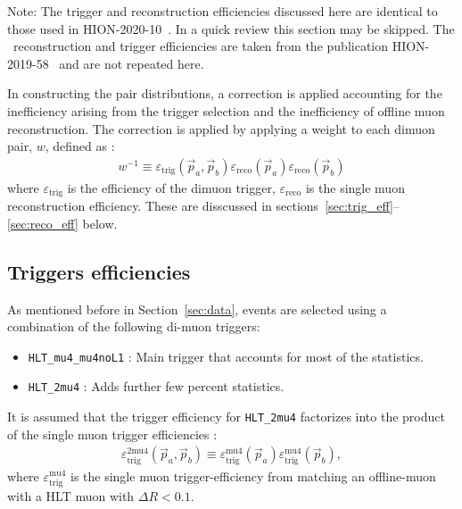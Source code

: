 {Note: The trigger and reconstruction efficiencies discussed here are
  identical to those used in HION-2020-10~\cite{HION-2020-10}.
In a quick review this section may be skipped.
The \pp\ reconstruction and trigger efficiencies are taken from
  the publication HION-2019-58~\cite{HION-2019-58} and are not repeated here.
}

In constructing the pair distributions, a correction is
  applied accounting for the inefficiency arising from the trigger
  selection and the inefficiency of offline muon reconstruction.
The correction is applied by applying a weight to each dimuon pair,
  $w$, defined as :
\begin{eqnarray}
w^{-1}\equiv \varepsilon_{\mathrm{trig}} (\vec{p}_{a},\vec{p}_{b})
\varepsilon_{\mathrm{reco}}(\vec{p}_{a})  \varepsilon_{\mathrm{reco}}(\vec{p}_{b})
\label{eq:net_eff_correction}
\end{eqnarray}
where $\varepsilon_{\mathrm{trig}}$ is the efficiency
  of the dimuon trigger,  $\varepsilon_{\mathrm{reco}}$ is the
  single muon reconstruction efficiency. 
These are disscussed in sections~\ref{sec:trig_eff}--\ref{sec:reco_eff} below.


\subsection{Triggers efficiencies\label{sec:trig_eff}}

As mentioned before in Section~\ref{sec:data}, events are selected using a combination
  of the following di-muon triggers:
\begin{itemize}
\item \verb=HLT_mu4_mu4noL1= : Main trigger that accounts for most of the statistics.
\item \verb=HLT_2mu4= : Adds further few percent statistics.
\end{itemize}


It is assumed that the trigger efficiency for \verb=HLT_2mu4= factorizes into the
  product of the single muon trigger efficiencies :
\begin{eqnarray}
\varepsilon_{\mathrm{trig}}^{\mathrm{2mu4}}
(\vec{p}_{a},\vec{p}_{b}) \equiv
\varepsilon_{\mathrm{trig}}^{\mathrm{mu4}}   (\vec{p}_{a})
\varepsilon_{\mathrm{trig}}^{\mathrm{mu4}}   (\vec{p}_{b}),
\label{eq:2mu3_eff}
\end{eqnarray}
where $\varepsilon_{\mathrm{trig}}^{\mathrm{mu4}} $ is the single muon
  trigger-efficiency from matching an offline-muon with 
  a HLT muon with $\Delta R < 0.1$.

